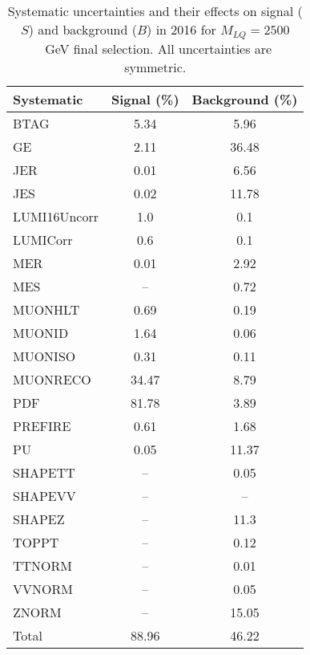 \begin{table}[htbp]
\begin{center}
\caption{Systematic uncertainties and their effects on signal ($S$) and background ($B$) in 2016 for $M_{LQ}=2500$~GeV final selection. All uncertainties are symmetric.}
\begin{tabular}{lcc}
\hline\hline
Systematic & Signal (\%) & Background (\%) \\ \hline 
BTAG & 5.34 & 5.96\\ 
GE & 2.11 & 36.48\\ 
JER & 0.01 & 6.56\\ 
JES & 0.02 & 11.78\\ 
LUMI16Uncorr & 1.0 & 0.1\\ 
LUMICorr & 0.6 & 0.1\\ 
MER & 0.01 & 2.92\\ 
MES & -- & 0.72\\ 
MUONHLT & 0.69 & 0.19\\ 
MUONID & 1.64 & 0.06\\ 
MUONISO & 0.31 & 0.11\\ 
MUONRECO & 34.47 & 8.79\\ 
PDF & 81.78 & 3.89\\ 
PREFIRE & 0.61 & 1.68\\ 
PU & 0.05 & 11.37\\ 
SHAPETT & -- & 0.05\\ 
SHAPEVV & -- & --\\ 
SHAPEZ & -- & 11.3\\ 
TOPPT & -- & 0.12\\ 
TTNORM & -- & 0.01\\ 
VVNORM & -- & 0.05\\ 
ZNORM & -- & 15.05\\ 
Total & 88.96 & 46.22\\ \hline \hline
\end{tabular}
\label{tab:SysUncertainties_uujj_2500}
\end{center}
\end{table}

